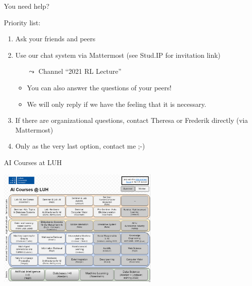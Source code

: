\documentclass[aspectratio=169]{../latex_main/tntbeamer}  %
\begin{document}
\begin{frame}[c]{You need help?}
	
Priority list:
	\begin{enumerate}
		\item Ask your friends and peers
		\item Use our chat system via Mattermost (see Stud.IP for invitation link)
		\begin{itemize}
		    \item[$\leadsto$] Channel ``2021 RL Lecture''
			\item You can also answer the questions of your peers! 
			\item We will only reply if we have the feeling that it is necessary.
		\end{itemize}
		\item If there are organizational questions, contact Theresa or Frederik directly (via Mattermost)
		\item Only as the very last option, contact me ;-)
	\end{enumerate}
	
\end{frame}
\begin{frame}{AI Courses at LUH}
    
    \centering
    \includegraphics[width=0.6\textwidth]{w00_init/images/ai_luh.PNG}
    
\end{frame}
\end{document}

